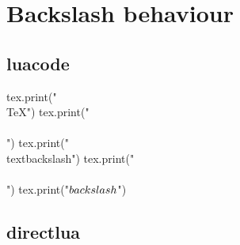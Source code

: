 \documentclass{article}
\begin{document}
\section*{Backslash behaviour}

\subsection*{luacode}

\begin{luacode*}
tex.print("\\TeX")
tex.print("\\\\")
tex.print("\\textbackslash")
tex.print("\\\\")
tex.print("$\\backslash$")
\end{luacode*}

\subsection*{directlua}


\end{document}

